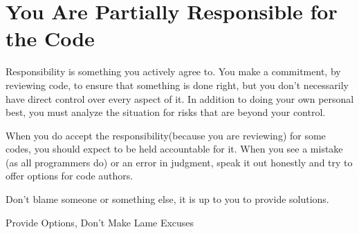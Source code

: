 
\chapter{You Are Partially Responsible for the Code}

Responsibility is something you actively agree to. You make a commitment, by reviewing code, to ensure that something is done right, but you don't necessarily
have direct control over every aspect of it. In addition to doing your own
personal best, you must analyze the situation for risks that are beyond
your control.

When you do accept the responsibility(because you are reviewing) for some codes, you should expect to be held accountable for it. When you see a mistake (as all programmers do) or an error in judgment, speak it out honestly and try to offer options for code authors.

Don't blame someone or something else, it is up to you to provide solutions.

\begin{marker}
Provide Options, Don't Make Lame Excuses
\end{marker}